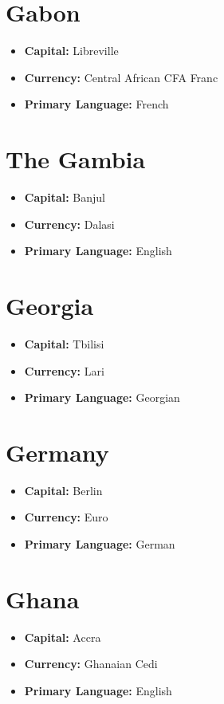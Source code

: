 \documentclass[a4paper,100pt,twoside]{book}
\begin{document}
\section*{\Huge Gabon}
\vspace{5mm} %
\begin{itemize}
	\item \textbf{Capital:} Libreville
	\item \textbf{Currency:} Central African CFA Franc
	\item \textbf{Primary Language:} French
\end{itemize}

\section*{\Huge The Gambia}
\vspace{5mm} %
\begin{itemize}
	\item \textbf{Capital:} Banjul
	\item \textbf{Currency:} Dalasi
	\item \textbf{Primary Language:} English
\end{itemize}

\section*{\Huge Georgia}
\vspace{5mm} %
\begin{itemize}
	\item \textbf{Capital:} Tbilisi
	\item \textbf{Currency:} Lari
	\item \textbf{Primary Language:} Georgian
\end{itemize}

\section*{\Huge Germany}
\vspace{5mm} %
\begin{itemize}
	\item \textbf{Capital:} Berlin
	\item \textbf{Currency:} Euro
	\item \textbf{Primary Language:} German
\end{itemize}

\section*{\Huge Ghana}
\vspace{5mm} %
\begin{itemize}
	\item \textbf{Capital:} Accra
	\item \textbf{Currency:} Ghanaian Cedi
	\item \textbf{Primary Language:} English
\end{itemize}
\end{document}
